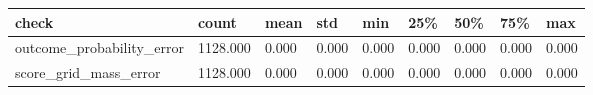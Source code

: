 \begin{tabular}{lllllllll}
\toprule
check & count & mean & std & min & 25\% & 50\% & 75\% & max \\
\midrule
outcome\_probability\_error & 1128.000 & 0.000 & 0.000 & 0.000 & 0.000 & 0.000 & 0.000 & 0.000 \\
score\_grid\_mass\_error & 1128.000 & 0.000 & 0.000 & 0.000 & 0.000 & 0.000 & 0.000 & 0.000 \\
\bottomrule
\end{tabular}
